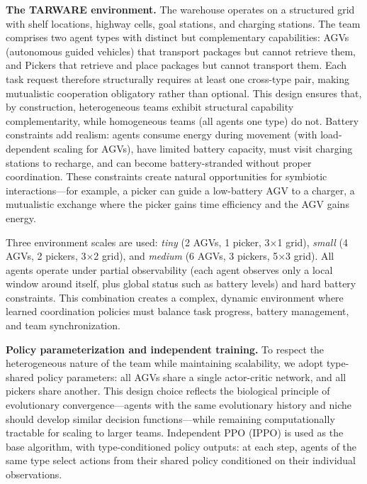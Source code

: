 \documentclass[Afour,sageh,times]{sagej}
\begin{document}
\textbf{The TARWARE environment.}
The warehouse operates on a structured grid with shelf locations, highway cells, goal stations, and charging stations. The team comprises two agent types with distinct but complementary capabilities: AGVs (autonomous guided vehicles) that transport packages but cannot retrieve them, and Pickers that retrieve and place packages but cannot transport them. Each task request therefore structurally requires at least one cross-type pair, making mutualistic cooperation obligatory rather than optional. This design ensures that, by construction, heterogeneous teams exhibit structural capability complementarity, while homogeneous teams (all agents one type) do not. Battery constraints add realism: agents consume energy during movement (with load-dependent scaling for AGVs), have limited battery capacity, must visit charging stations to recharge, and can become battery-stranded without proper coordination. These constraints create natural opportunities for symbiotic interactions---for example, a picker can guide a low-battery AGV to a charger, a mutualistic exchange where the picker gains time efficiency and the AGV gains energy.

Three environment scales are used: \emph{tiny} (2 AGVs, 1 picker, 3×1 grid), \emph{small} (4 AGVs, 2 pickers, 3×2 grid), and \emph{medium} (6 AGVs, 3 pickers, 5×3 grid). All agents operate under partial observability (each agent observes only a local window around itself, plus global status such as battery levels) and hard battery constraints. This combination creates a complex, dynamic environment where learned coordination policies must balance task progress, battery management, and team synchronization.

\textbf{Policy parameterization and independent training.}
To respect the heterogeneous nature of the team while maintaining scalability, we adopt type-shared policy parameters: all AGVs share a single actor-critic network, and all pickers share another. This design choice reflects the biological principle of evolutionary convergence---agents with the same evolutionary history and niche should develop similar decision functions---while remaining computationally tractable for scaling to larger teams. Independent PPO (IPPO) is used as the base algorithm, with type-conditioned policy outputs: at each step, agents of the same type select actions from their shared policy conditioned on their individual observations.
\end{document}
